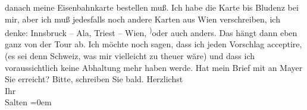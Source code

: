 \begin{ledgroupsized}[t]{13cm}
               danach meine Eisenbahnkarte bestellen muß. Ich habe die Karte bis Bludenz bei mir, aber ich muß jedesfalls noch andere Karten
               aus Wien verschreiben, ich denke: \strikeout{(}Innsbruck – Ala, Triest – Wien, \substVorne{}\textsuperscript{)}\substDazwischen{}o\substHinten{}der auch anders. Das hängt dann eben ganz von der Tour ab. {\pb}Ich möchte noch sagen, dass ich
               jeden Vorschlag acceptire, (es sei denn Schweiz, was mir vielleicht zu theuer wäre) und dass ich voraussichtlich keine
               Abhaltung mehr haben werde.\pend
           \pstart
           Hat mein Brief mit
               \label{K_L03310-2v}\label{K_L03310-2h} an Mayer Sie erreicht?\pend
           \pstart
           Bitte, schreiben Sie bald.\pend
           \pstart
           Herzlichst {\\[\baselineskip]}Ihr {\\[\baselineskip]}\spacefill\mbox{Salten}\pend
           \leftskip=0em{}
         
         \endnumbering{}\end{ledgroupsized}  \newcommand{\dateiname}{L03310}\newcommand{\titel}{Felix Salten an Arthur Schnitzler, 14. 8. 1900}\newcommand{\editorInnen}{Martin Anton Müller und Laura Untner}
      